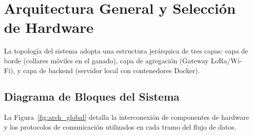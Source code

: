 \section{Arquitectura General y Selección de Hardware}

La topología del sistema adopta una estructura jerárquica de tres capas: capa de borde (collares móviles en el ganado), capa de agregación (Gateway LoRa/Wi-Fi), y capa de backend (servidor local con contenedores Docker).

\subsection{Diagrama de Bloques del Sistema}

La Figura~\ref{fig:arch_global} detalla la interconexión de componentes de hardware y los protocolos de comunicación utilizados en cada tramo del flujo de datos.

